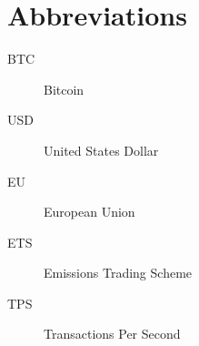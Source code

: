 \chapter*{Abbreviations}\label{abbr}
\begin{description}
    \item[BTC] Bitcoin
    \item[USD] United States Dollar
    \item[EU] European Union
    \item[ETS] Emissions Trading Scheme
    \item[TPS] Transactions Per Second
\end{description}
